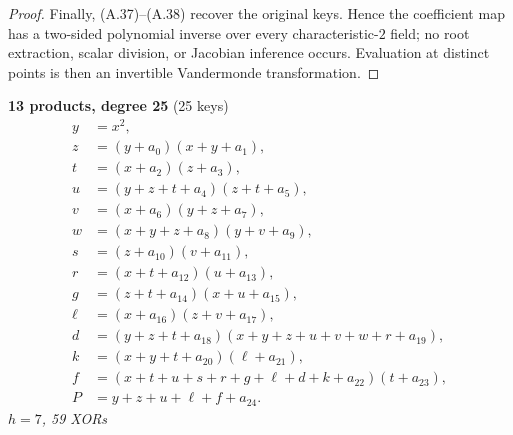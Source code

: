 \begin{proof}
Finally, (A.37)--(A.38) recover the original keys.  Hence the coefficient map
has a two-sided polynomial inverse over every characteristic-$2$ field; no
root extraction, scalar division, or Jacobian inference occurs.  Evaluation
at distinct points is then an invertible Vandermonde transformation.
\end{proof}

\medskip
\noindent
\begin{minipage}[t]{\textwidth}
\textbf{13 products, degree 25} (25 keys)
\[
\begin{aligned}
y &= x^2,\\
z &= (y+a_0)(x+y+a_1),\\
t &= (x+a_2)(z+a_3),\\
u &= (y+z+t+a_4)(z+t+a_5),\\
v &= (x+a_6)(y+z+a_7),\\
w &= (x+y+z+a_8)(y+v+a_9),\\
s &= (z+a_{10})(v+a_{11}),\\
r &= (x+t+a_{12})(u+a_{13}),\\
g &= (z+t+a_{14})(x+u+a_{15}),\\
\ell &= (x+a_{16})(z+v+a_{17}),\\
d &= (y+z+t+a_{18})(x+y+z+u+v+w+r+a_{19}),\\
k &= (x+y+t+a_{20})(\ell+a_{21}),\\
f &= (x+t+u+s+r+g+\ell+d+k+a_{22})(t+a_{23}),\\
P &= y+z+u+\ell+f+a_{24}.
\end{aligned}
\]
\emph{$h=7$, 59 XORs}
\end{minipage}

